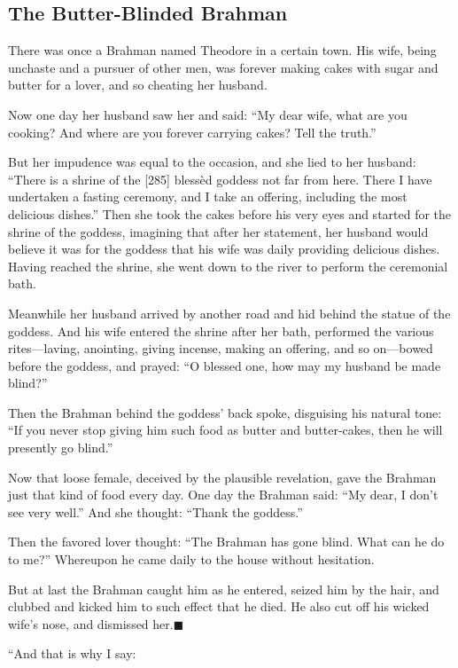 \documentclass[article, twoside, 14pt]{memoir}
\newcommand{\qed}{\hfill \ensuremath{\blacksquare}}
\begin{document}
\subsection{The Butter-Blinded Brahman}

\label{s64}

There was once a Brahman named Theodore in a certain town. His
wife, being unchaste and a pursuer of other men, was forever making
cakes with sugar and butter for a lover, and so cheating her
husband.

Now one day her husband saw her and said:
``My dear wife, what are you cooking? And where are you forever carrying cakes? Tell the truth.''

But her impudence was equal to the occasion, and she lied to her
husband:
``There is a shrine of the [285] blessèd goddess not far from here. There I have undertaken a fasting ceremony, and I take an offering, including the most delicious dishes.''
Then she took the cakes before his very eyes and started for the
shrine of the goddess, imagining that after her statement, her
husband would believe it was for the goddess that his wife was
daily providing delicious dishes. Having reached the shrine, she
went down to the river to perform the ceremonial bath.

Meanwhile her husband arrived by another road and hid behind the
statue of the goddess. And his wife entered the shrine after her
bath, performed the various rites---laving, anointing, giving
incense, making an offering, and so on---bowed before the goddess,
and prayed: ``O blessed one, how may my husband be made blind?''

Then the Brahman behind the goddess' back spoke, disguising his
natural tone:
``If you never stop giving him such food as butter and butter-cakes, then he will presently go blind.''

Now that loose female, deceived by the plausible revelation, gave
the Brahman just that kind of food every day. One day the Brahman
said: ``My dear, I don't see very well.'' And she thought:
``Thank the goddess.''

Then the favored lover thought:
``The Brahman has gone blind. What can he do to me?'' Whereupon he
came daily to the house without hesitation.

But at last the Brahman caught him as he entered, seized him by the
hair, and clubbed and kicked him to such effect that he died. He
also cut off his wicked wife's nose, and dismissed
her.\hyperref[s64]{\qed}

“And that is why I say:
\end{document}
